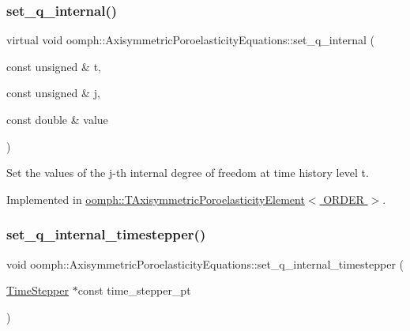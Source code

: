 \subsubsection{\texorpdfstring{set\+\_\+q\+\_\+internal()}{set\_q\_internal()}\hspace{0.1cm}{\footnotesize\ttfamily [2/2]}}
{\footnotesize\ttfamily virtual void oomph\+::\+Axisymmetric\+Poroelasticity\+Equations\+::set\+\_\+q\+\_\+internal (\begin{DoxyParamCaption}\item[{const unsigned \&}]{t,  }\item[{const unsigned \&}]{j,  }\item[{const double \&}]{value }\end{DoxyParamCaption})\hspace{0.3cm}{\ttfamily [pure virtual]}}



Set the values of the j-\/th internal degree of freedom at time history level t. 



Implemented in \hyperlink{classoomph_1_1TAxisymmetricPoroelasticityElement_a00e8333ce5109b945075ebe1b355c742}{oomph\+::\+T\+Axisymmetric\+Poroelasticity\+Element$<$ O\+R\+D\+E\+R $>$}.

\mbox{\label{classoomph_1_1AxisymmetricPoroelasticityEquations_aaa80b2ec1bfc01f49577560835d9d86d}} 
\subsubsection{\texorpdfstring{set\+\_\+q\+\_\+internal\+\_\+timestepper()}{set\_q\_internal\_timestepper()}}
{\footnotesize\ttfamily void oomph\+::\+Axisymmetric\+Poroelasticity\+Equations\+::set\+\_\+q\+\_\+internal\+\_\+timestepper (\begin{DoxyParamCaption}\item[{\hyperlink{classoomph_1_1TimeStepper}{Time\+Stepper} $\ast$const}]{time\+\_\+stepper\+\_\+pt }\end{DoxyParamCaption})\hspace{0.3cm}{\ttfamily [inline]}}



